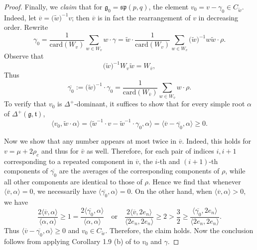 \documentclass[11pt]{amsart}
\theoremstyle{plain}
\theoremstyle{definition}
\newcommand{\frg}{\mathfrak{g}}
\newcommand{\frt}{\mathfrak{t}}
\begin{document}
\begin{proof}
 	 Finally, we \emph{claim} that for $\frg_0=\mathfrak{sp}(p,q)$, the element $v_0=v-\gamma_0\in C_{\widetilde{w}}$. Indeed, let $\overline{v}=\big(\widetilde{w}\big)^{-1}v$; then $\overline{v}$ is in fact the rearrangement of $v$ in decreasing order. Rewrite
 	 	\[\gamma_0=\dfrac{1}{\mathrm{card}(W_v)}\sum_{w\in W_v}w\cdot \gamma=\widetilde{w}\cdot\dfrac{1}{\mathrm{card}(W_v)}\sum_{w\in W_v}\big(\widetilde{w}\big)^{-1}w\widetilde{w}\cdot\rho.\]
 	 Observe that
 	 \[\big(\widetilde{w}\big)^{-1}W_v\widetilde{w}=W_{\overline{v}},\]
 	 Thus
 	 \[\overline{\gamma_0}:=\big(\widetilde{w}\big)^{-1}\cdot\gamma_0=\dfrac{1}{\mathrm{card}(W_{\overline{v}})}\sum_{w\in W_{\overline{v}}}w\cdot\rho.\]
 	 To verify that $v_0$ is $\Delta^+$-dominant, it suffices to show that for every simple root $\alpha$ of $\Delta^+(\frg,\frt)$,
 	 	\[\langle v_0,\widetilde{w}\cdot\alpha\rangle=\langle \widetilde{w}^{-1}\cdot v-\widetilde{w}^{-1}\cdot \gamma_0,\alpha\rangle=\langle \overline{v}-\overline{\gamma_0},\alpha\rangle\ge 0.\]
 	
 	 Now we show that  any number appears at most twice in $\overline{v}$. Indeed, this holds for $v=\mu+2\rho_c$ and thus for $\bar{v}$ as well. Therefore, for each pair of indices $i,i+1$ corresponding to a repeated component in $\overline{v}$, the $i$-th and $(i+1)$-th components of $\overline{\gamma_0}$ are the averages of the corresponding components of $\rho$, while all other components are identical to those of $\rho$. Hence we find that whenever $\langle\overline{v}, \alpha\rangle=0$, we necessarily have $\langle\overline{\gamma_0}, \alpha\rangle=0$. On the other hand, when $\langle\overline{v}, \alpha\rangle>0$, we have
 	 \[\dfrac{2\langle \overline{v},\alpha\rangle}{\langle\alpha,\alpha\rangle}\ge 1=\dfrac{2\langle\overline{\gamma_0},\alpha\rangle}{\langle\alpha,\alpha\rangle}\quad \mathrm{or}\quad \dfrac{2\langle \overline{v},2e_n \rangle}{\langle 2e_n,2e_n \rangle}\ge 2>\dfrac{3}{2}\ge \dfrac{\langle\overline{\gamma_0},2e_n\rangle}{\langle 2e_n,2e_n\rangle}.\]
 	 Thus $\langle\overline{v}-\overline{\gamma_0},\alpha\rangle\ge 0$ and $v_0\in C_{\widetilde{w}}$. Therefore, the claim holds. Now the conclusion follows from applying Corollary 1.9 (b) of \cite{SV} to $v_0$ and $\gamma$.
 \end{proof}
\end{document}
